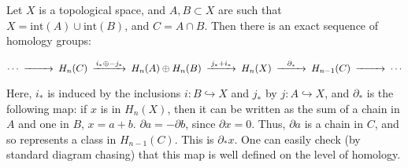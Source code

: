 \documentclass[12pt]{article}
\begin{document}
Let $X$ is a topological space, and $A,B\subset X$ are such that $X=\mathrm{int}(A)\cup\mathrm{int}
(B)$, and $C=A\cap B$. Then there is an exact sequence of homology groups:

$$\begin{CD}
\cdots@>>>H_n(C)@>{i_*\oplus -j_*}>> H_n(A)\oplus H_n(B)@>{j_*+i_*}>>H_n(X)@>\partial_*>>
H_{n-1}(C)@>>>\cdots
\end{CD}$$

Here, $i_*$ is induced by the inclusions $i:B\hookrightarrow X$ and $j_*$ by $j:
A\hookrightarrow X$, and $\partial_*$ is the following map:
 if $x$ is in $H_n(X)$, then it can be written as the sum of a chain in $A$ and one in $B$, $x=a+b$.
$\partial a=-\partial b$, since $\partial x=0$.  Thus, $\partial a$ is a chain in $C$, and so represents
a class in $H_{n-1}(C)$.  This is $\partial_*x$.  One can easily check (by standard diagram chasing) that this map is well defined on the level of homology.
\end{document}

